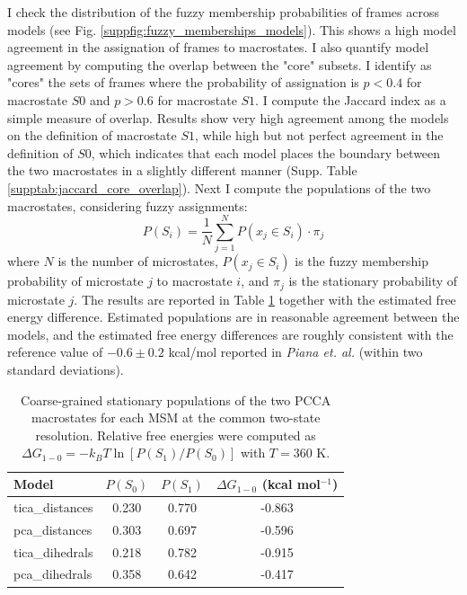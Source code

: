 \documentclass[prl,twocolumn]{revtex4-1}
\begin{document}
I check the distribution of the fuzzy membership probabilities of frames across models (see Fig. \ref{suppfig:fuzzy_memberships_models}). This shows a high model agreement in the assignation of frames to macrostates.
I also quantify model agreement by computing the overlap between the "core" subsets. I identify as "cores" the sets of frames where the probability of assignation is $p<0.4$ for macrostate $S0$ and $p>0.6$ for macrostate $S1$. I compute the Jaccard index as a simple measure of overlap. Results 
show very high agreement among the models on the definition of macrostate $S1$, while high but not perfect agreement in the definition of $S0$, which indicates that each model places the boundary between the two macrostates in a slightly different manner (Supp. Table \ref{supptab:jaccard_core_overlap}).
Next I compute the populations of the two macrostates, considering fuzzy assignments:
$$
P(S_i) = \frac{1}{N} \sum_{j=1}^{N} P(x_j \in S_i) \cdot \pi_j
$$
where $N$ is the number of microstates, $P(x_j \in S_i)$ is the fuzzy membership probability of microstate $j$ to macrostate $i$, and $\pi_j$ is the stationary probability of microstate $j$.
The results are reported in Table \ref{tab:pcca_two_state_populations} together with the estimated free energy difference. 
Estimated populations are in reasonable agreement between the models, and the estimated free energy differences are roughly consistent with the reference value of $-0.6\pm 0.2$ kcal/mol reported in \textit{Piana et. al.} \cite{Piana2012} (within two standard deviations). 

\begin{table}
\caption{Coarse-grained stationary populations of the two PCCA macrostates for each MSM at the common two-state resolution. Relative free energies were computed as $\Delta G_{1-0} = -k_B T \ln[P(S_1)/P(S_0)]$ with $T=360$ K.}
\label{tab:pcca_two_state_populations}
\begin{tabular}{lccc}
\hline
Model & $P(S_0)$ & $P(S_1)$ & $\Delta G_{1-0}$ (kcal mol$^{-1}$) \\
\hline
tica\_distances & 0.230 & 0.770 & -0.863 \\
pca\_distances & 0.303 & 0.697 & -0.596 \\
tica\_dihedrals & 0.218 & 0.782 & -0.915 \\
pca\_dihedrals & 0.358 & 0.642 & -0.417 \\
\hline
\end{tabular}
\end{table}
\end{document}

